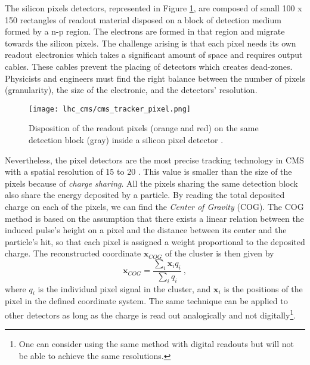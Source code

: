                 The silicon pixels detectors, represented in Figure \ref{fig:lhc_and_cms__cms_pixel_detector}, are composed of small 100 \um{} x 150 \um{} rectangles of readout material disposed on a block of detection medium formed by a n-p region. The electrons are formed in that region and migrate towards the silicon pixels. The challenge arising is that each pixel needs its own readout electronics which takes a significant amount of space and requires output cables. These cables prevent the placing of detectors which creates dead-zones. Physicists and engineers must find the right balance between the number of pixels (granularity), the size of the electronic, and the detectors' resolution. \\

                \begin{figure}[h!]
                    \centering
                    \texttt{[image: lhc\_cms/cms\_tracker\_pixel.png]}
                    \caption{Disposition of the readout pixels (orange and red) on the same detection block (gray) inside a silicon pixel detector \Cite{CMS_Tracker_Construction}.}
                    \label{fig:lhc_and_cms__cms_pixel_detector}
                \end{figure}    

                Nevertheless, the pixel detectors are the most precise tracking technology in CMS with a spatial resolution of 15 to 20 \um{}. This value is smaller than the size of the pixels because of \emph{charge sharing}. All the pixels sharing the same detection block also share the energy deposited by a particle. By reading the total deposited charge on each of the pixels, we can find the \emph{Center of Gravity} (COG). The COG method is based on the assumption that there exists a linear relation between the induced pulse's height on a pixel and the distance between its center and the particle's hit, so that each pixel is assigned a weight proportional to the deposited charge. The reconstructed coordinate $ \mathbf{x}_{COG} $ of the cluster is then given by 
                \begin{equation}
                    \mathbf{x}_{COG} = \frac{\sum_i \mathbf{x}_i q_i}{\sum_i q_i} \ ,
                    \label{eq:lhc_and_cms__charge_sharing}
                \end{equation}
                where $ q_i $ is the individual pixel signal in the cluster, and $ \mathbf{x}_i $ is the positions of the pixel in the defined coordinate system. The same technique can be applied to other detectors as long as the charge is read out analogically and not digitally\footnote{One can consider using the same method with digital readouts but will not be able to achieve the same resolutions.}.           
            

